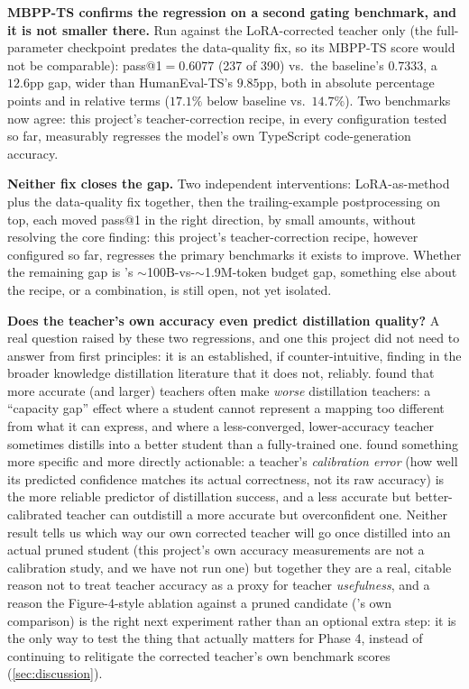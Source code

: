 \documentclass{article}
\theoremstyle{plain}
\theoremstyle{definition}
\theoremstyle{remark}
\begin{document}
\textbf{MBPP-TS confirms the regression on a second gating benchmark,
and it is not smaller there.} Run against the LoRA-corrected teacher
only (the full-parameter checkpoint predates the data-quality fix, so
its MBPP-TS score would not be comparable): pass@1$=0.6077$ (237 of
390) vs.\ the baseline's $0.7333$, a $12.6$pp gap, wider than
HumanEval-TS's $9.85$pp, both in absolute percentage points and in
relative terms ($17.1\%$ below baseline vs.\ $14.7\%$). Two
benchmarks now agree: this project's teacher-correction recipe, in
every configuration tested so far, measurably regresses the model's own
TypeScript code-generation accuracy.

\textbf{Neither fix closes the gap.} Two independent interventions:
LoRA-as-method plus the data-quality fix together, then the
trailing-example postprocessing on top, each moved pass@1 in the right
direction, by small amounts, without resolving the core finding: this
project's teacher-correction recipe, however configured so far,
regresses the primary benchmarks it exists to improve. Whether the
remaining gap is \citet{minitron2024practice}'s
$\sim$100B-vs-$\sim$1.9M-token budget gap, something else about the
recipe, or a combination, is still open, not yet isolated.

\textbf{Does the teacher's own accuracy even predict distillation
quality?} A real question raised by these two regressions, and one
this project did not need to answer from first principles: it is an
established, if counter-intuitive, finding in the broader knowledge
distillation literature that it does not, reliably.
\citet{choharihan2019} found that more accurate (and larger) teachers
often make \emph{worse} distillation teachers: a ``capacity gap'' effect
where a student cannot represent a mapping too different from what it
can express, and where a less-converged, lower-accuracy teacher
sometimes distills into a better student than a fully-trained one.
\citet{teachercalib2025} found something more specific and more directly
actionable: a teacher's \emph{calibration error} (how well its
predicted confidence matches its actual correctness, not its raw
accuracy) is the more reliable predictor of distillation success,
and a less accurate but better-calibrated teacher can outdistill a more
accurate but overconfident one. Neither result tells us which way our
own corrected teacher will go once distilled into an actual pruned
student (this project's own accuracy measurements are not a
calibration study, and we have not run one) but together they are a
real, citable reason not to treat teacher accuracy as a proxy for
teacher \emph{usefulness}, and a reason the Figure-4-style ablation
against a pruned candidate (\citet{minitron2024practice}'s own
comparison) is the right next experiment rather than an optional extra
step: it is the only way to test the thing that actually matters for
Phase 4, instead of continuing to relitigate the corrected teacher's own
benchmark scores (\cref{sec:discussion}).
\end{document}
